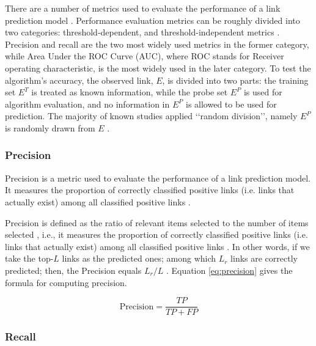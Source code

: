 There are a number of metrics used to evaluate the performance of a link prediction model \cite{arrar2023comprehensive}. Performance evaluation metrics can be roughly divided into two categories: threshold-dependent, and threshold-independent metrics \cite{zhou2021progresses}. Precision and recall are the two most widely used metrics in the former category, while Area Under the ROC Curve (AUC), where ROC stands for Receiver operating characteristic, is the most widely used in the later category. To test the algorithm’s accuracy, the observed link, $E$, is divided into two parts: the training set $E^T$ is treated as known information, while the probe set $E^P$ is used for algorithm evaluation, and no information in $E^P$ is allowed to be used for prediction. The majority of known studies applied ‘‘random division’’, namely $E^P$ is randomly drawn from $E$ \cite{zhou2021progresses}.



\subsubsection{Precision}

Precision is a metric used to evaluate the performance of a link prediction model. It measures the proportion of correctly classified positive links (i.e. links that actually exist) among all classified positive links \cite{arrar2023comprehensive}.

Precision is defined as the ratio of relevant items selected to the number of items selected \cite{zhou2021progresses}, i.e., it measures the proportion of correctly classified positive links (i.e. links that actually exist) among all classified positive links \cite{arrar2023comprehensive}. In other words, if we take the top-$L$ links as the predicted ones; among which $L_r$ links are correctly predicted; then, the Precision equals $L_r/L$ \cite{zhou2021progresses}. Equation \ref{eq:precision} gives the formula for computing precision.

\begin{equation}
\label{eq:precision}
  \text{Precision} = \frac{TP}{TP + FP}
\end{equation}


\subsubsection{Recall}

